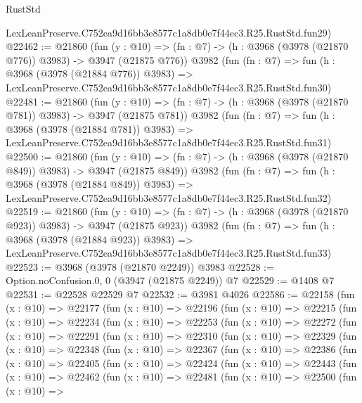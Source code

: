 \begin{lexlean}{RustStd}
\begin{coremodule}
    LexLeanPreserve.C752ea9d16bb3e8577c1a8db0e7f44ec3.R25.RustStd.fun29)
@22462 := @21860
    (fun (y : @10) => (fn : @7) -> (h : @3968 (@3978 (@21870 @776)) @3983) -> @3947 (@21875 @776))
    @3982
    (fun (fn : @7) =>
    fun (h : @3968 (@3978 (@21884 @776)) @3983) =>
    LexLeanPreserve.C752ea9d16bb3e8577c1a8db0e7f44ec3.R25.RustStd.fun30)
@22481 := @21860
    (fun (y : @10) => (fn : @7) -> (h : @3968 (@3978 (@21870 @781)) @3983) -> @3947 (@21875 @781))
    @3982
    (fun (fn : @7) =>
    fun (h : @3968 (@3978 (@21884 @781)) @3983) =>
    LexLeanPreserve.C752ea9d16bb3e8577c1a8db0e7f44ec3.R25.RustStd.fun31)
@22500 := @21860
    (fun (y : @10) => (fn : @7) -> (h : @3968 (@3978 (@21870 @849)) @3983) -> @3947 (@21875 @849))
    @3982
    (fun (fn : @7) =>
    fun (h : @3968 (@3978 (@21884 @849)) @3983) =>
    LexLeanPreserve.C752ea9d16bb3e8577c1a8db0e7f44ec3.R25.RustStd.fun32)
@22519 := @21860
    (fun (y : @10) => (fn : @7) -> (h : @3968 (@3978 (@21870 @923)) @3983) -> @3947 (@21875 @923))
    @3982
    (fun (fn : @7) =>
    fun (h : @3968 (@3978 (@21884 @923)) @3983) =>
    LexLeanPreserve.C752ea9d16bb3e8577c1a8db0e7f44ec3.R25.RustStd.fun33)
@22523 := @3968 (@3978 (@21870 @2249)) @3983
@22528 := Option.noConfusion.{0, 0} (@3947 (@21875 @2249)) @7
@22529 := @1408 @7
@22531 := @22528 @22529 @7
@22532 := @3981 @4026
@22586 := @22158
    (fun (x : @10) =>
    @22177
      (fun (x : @10) =>
      @22196
        (fun (x : @10) =>
        @22215
          (fun (x : @10) =>
          @22234
            (fun (x : @10) =>
            @22253
              (fun (x : @10) =>
              @22272
                (fun (x : @10) =>
                @22291
                  (fun (x : @10) =>
                  @22310
                    (fun (x : @10) =>
                    @22329
                      (fun (x : @10) =>
                      @22348
                        (fun (x : @10) =>
                        @22367
                          (fun (x : @10) =>
                          @22386
                            (fun (x : @10) =>
                            @22405
                              (fun (x : @10) =>
                              @22424
                                (fun (x : @10) =>
                                @22443
                                  (fun (x : @10) =>
                                  @22462
                                    (fun (x : @10) =>
                                    @22481
                                      (fun (x : @10) =>
                                      @22500
                                        (fun (x : @10) =>

\end{coremodule}
\end{lexlean}
